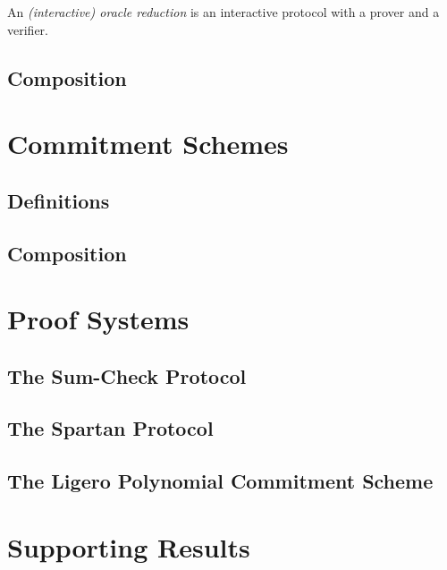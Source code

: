 \begin{definition}\label{def:oracle_reduction}
    An \emph{(interactive) oracle reduction} is an interactive protocol with a prover and a verifier.
\end{definition}

\begin{definition}[Completeness]
    \label{def:completeness}
\end{definition}

\section{Composition}

\chapter{Commitment Schemes}

\section{Definitions}

\section{Composition}



\chapter{Proof Systems}

\section{The Sum-Check Protocol}

\section{The Spartan Protocol}

\section{The Ligero Polynomial Commitment Scheme}


\chapter{Supporting Results}

